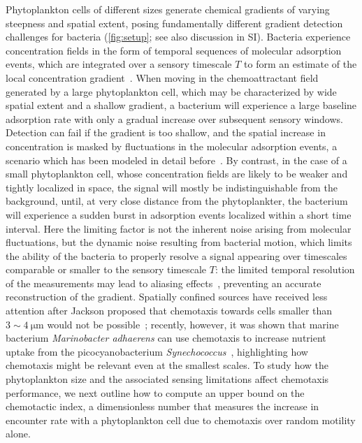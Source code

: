 \documentclass[9pt,twocolumn,twoside]{pnas-new}
\begin{document}
Phytoplankton cells of different sizes generate chemical gradients of varying steepness and spatial extent, posing fundamentally different gradient detection challenges for bacteria (\autoref{fig:setup}; see also discussion in SI).
Bacteria experience concentration fields in the form of temporal sequences of molecular adsorption events, which are integrated over a sensory timescale $T$ to form an estimate of the local concentration gradient~\cite{berg1977physics}. When moving in the chemoattractant field generated by a large phytoplankton cell, which may be characterized by wide spatial extent and a shallow gradient, a bacterium will experience a large baseline adsorption rate with only a gradual increase over subsequent sensory windows. Detection can fail if the gradient is too shallow, and the spatial increase in concentration is masked by fluctuations in the molecular adsorption events, a scenario which has been modeled in detail before~\cite{mora2010limits}.
By contrast, in the case of a small phytoplankton cell, whose concentration fields are likely to be weaker and tightly localized in space, the signal will mostly be indistinguishable from the background, until, at very close distance from the phytoplankter, the bacterium will experience a sudden burst in adsorption events localized within a short time interval.
Here the limiting factor is not the inherent noise arising from molecular fluctuations, but the dynamic noise resulting from bacterial motion, which limits the ability of the bacteria to properly resolve a signal appearing over timescales comparable or smaller to the sensory timescale $T$: the limited temporal resolution of the measurements may lead to aliasing effects~\cite{blackman1958measurement}, preventing an accurate reconstruction of the gradient.
Spatially confined sources have received less attention after Jackson proposed that chemotaxis towards cells smaller than $3\sim\SI{4}{\micro\m}$ would not be possible~\cite{jackson1987simulating}; recently, however, it was shown that marine bacterium \emph{Marinobacter adhaerens} can use chemotaxis to increase nutrient uptake from the picocyanobacterium \emph{Synechococcus}~\cite{raina2023chemotaxis}, highlighting how chemotaxis might be relevant even at the smallest scales.
To study how the phytoplankton size and the associated sensing limitations affect chemotaxis performance, we next outline how to compute an upper bound on the chemotactic index, a dimensionless number that measures the increase in encounter rate with a phytoplankton cell due to chemotaxis over random motility alone.
\end{document}
